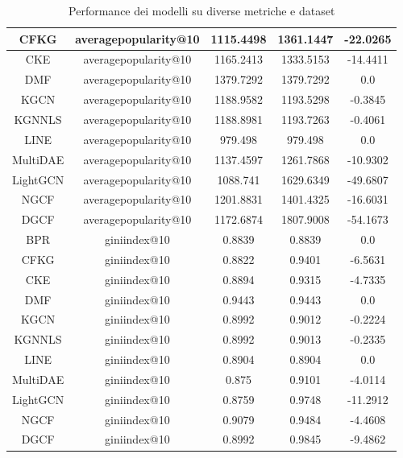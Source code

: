 \begin{table}[H]
{\begin{tabular}{|c|c|c|c|c|}
    CFKG & averagepopularity@10 & 1115.4498 & 1361.1447 & -22.0265 \\\hline
    CKE & averagepopularity@10 & 1165.2413 & 1333.5153 & -14.4411 \\\hline
    DMF & averagepopularity@10 & 1379.7292 & 1379.7292 & 0.0 \\\hline
    KGCN & averagepopularity@10 & 1188.9582 & 1193.5298 & -0.3845 \\\hline
    KGNNLS & averagepopularity@10 & 1188.8981 & 1193.7263 & -0.4061 \\\hline
    LINE & averagepopularity@10 & 979.498 & 979.498 & 0.0 \\\hline
    MultiDAE & averagepopularity@10 & 1137.4597 & 1261.7868 & -10.9302 \\\hline
    LightGCN & averagepopularity@10 & 1088.741 & 1629.6349 & -49.6807 \\\hline
    NGCF & averagepopularity@10 & 1201.8831 & 1401.4325 & -16.6031 \\\hline
    DGCF & averagepopularity@10 & 1172.6874 & 1807.9008 & -54.1673 \\ \hline
    BPR & giniindex@10 & 0.8839 & 0.8839 & 0.0 \\\hline
    CFKG & giniindex@10 & 0.8822 & 0.9401 & -6.5631 \\\hline
    CKE & giniindex@10 & 0.8894 & 0.9315 & -4.7335 \\\hline
    DMF & giniindex@10 & 0.9443 & 0.9443 & 0.0 \\\hline
    KGCN & giniindex@10 & 0.8992 & 0.9012 & -0.2224 \\\hline
    KGNNLS & giniindex@10 & 0.8992 & 0.9013 & -0.2335 \\\hline
    LINE & giniindex@10 & 0.8904 & 0.8904 & 0.0 \\\hline
    MultiDAE & giniindex@10 & 0.875 & 0.9101 & -4.0114 \\\hline
    LightGCN & giniindex@10 & 0.8759 & 0.9748 & -11.2912 \\\hline
    NGCF & giniindex@10 & 0.9079 & 0.9484 & -4.4608 \\\hline
    DGCF & giniindex@10 & 0.8992 & 0.9845 & -9.4862 \\ \hline
\end{tabular}
    }
    \caption{Performance dei modelli su diverse metriche e dataset}
    \end{table}


